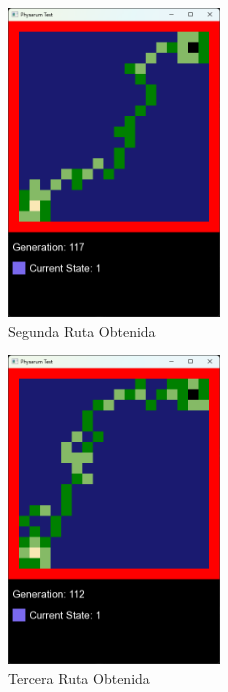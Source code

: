     \vskip 0.5cm
    \begin{figure}[htbp]
        \centering
        \includegraphics[width=0.5\textwidth]{./images/Pruebas/simulador/image013.png}
        \caption{Segunda Ruta Obtenida}
        \label{fig:Ruta 3}
    \end{figure}
    \vskip 0.5cm
    \begin{figure}[htbp]
        \centering
        \includegraphics[width=0.5\textwidth]{./images/Pruebas/simulador/image015.png}
        \caption{Tercera Ruta Obtenida}
        \label{fig:Ruta 4}
    \end{figure}
    \vskip 0.5cm

